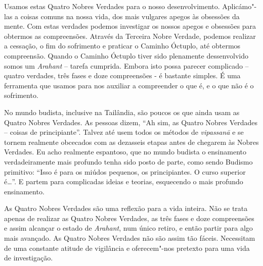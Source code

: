 Usamos estas Quatro Nobres Verdades para o nosso desenvolvimento. Aplicámo"-las a
coisas comuns na nossa vida, dos mais vulgares apegos às obsessões da mente. Com
estas verdades podemos investigar os nossos apegos e obsessões para obtermos as
compreensões. Através da Terceira Nobre Verdade, podemos realizar a cessação, o
fim do sofrimento e praticar o Caminho Óctuplo, até obtermos compreensão.
Quando o Caminho Óctuplo tiver sido plenamente dessenvolvido somos um
\emph{Arahant} – tarefa cumprida. Embora isto possa parecer complicado – quatro
verdades, três fases e doze compreensões - é bastante simples. É uma ferramenta
que usamos para nos auxiliar a compreender o que é, e o que não é o sofrimento.

No mundo budista, inclusive na Tailândia, são poucos os que ainda usam as Quatro Nobres Verdades.
As pessoas dizem, “Ah sim, as Quatro Nobres Verdades –
coisas de principiante”. Talvez até usem todos os métodos de \emph{vipassanā} e
se tornem realmente obcecados com as dezasseis etapas antes de chegarem às
Nobres Verdades. Eu acho realmente espantoso, que no mundo budista o ensinamento
verdadeiramente mais profundo tenha sido posto de parte, como sendo Budismo
primitivo: “Isso é para os miúdos pequenos, os principiantes. O curso superior
é\ldots{}”. E partem para complicadas ideias e teorias, esquecendo o mais
profundo ensinamento.

As Quatro Nobres Verdades são uma reflexão para a vida inteira. Não se trata
apenas de realizar as Quatro Nobres Verdades, as três fases e doze compreensões e
assim alcançar o estado de \emph{Arahant}, num único retiro, e então partir para
algo mais avançado. As Quatro Nobres Verdades não são assim tão fáceis.
Necessitam de uma constante atitude de vigilância e oferecem"-nos pretexto para
uma vida de investigação.

